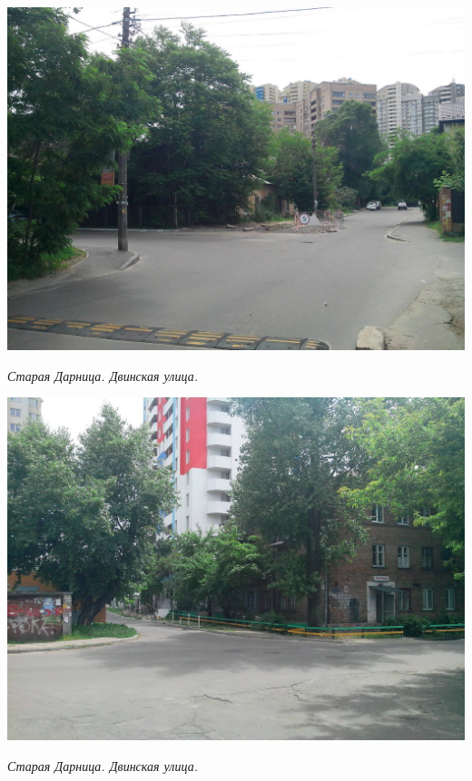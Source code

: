 \begin{center}
\includegraphics[width=\linewidth]{lpix/IMG_20160613_140013.jpg}

\textit{Старая Дарница. Двинская улица.}
\end{center}

\begin{center}
\includegraphics[width=\linewidth]{lpix/IMG_20160613_140125.jpg}

\textit{Старая Дарница. Двинская улица.}
\end{center}


